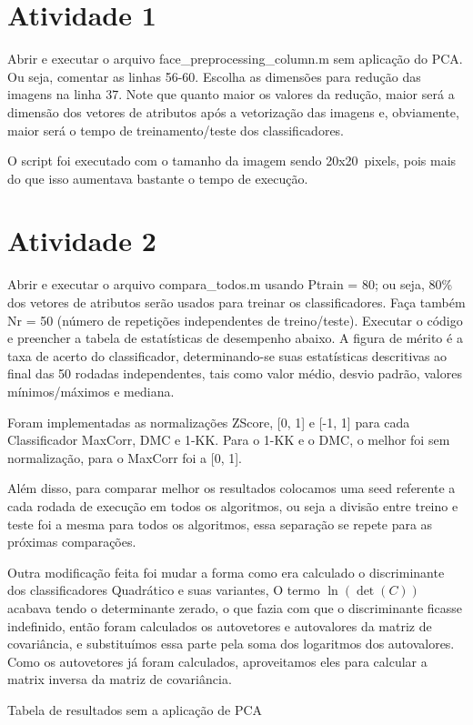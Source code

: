 \documentclass[a4paper,12pt]{article}
\newcommand{\nonumsection}[1]{%
  \section*{#1}%
  \addcontentsline{toc}{section}{#1}%
}
\begin{document}
\nonumsection{Atividade 1}
\begin{tcolorbox}[colback=blue!5!white, colframe=blue!75!black]
    Abrir e executar o arquivo face\_preprocessing\_column.m sem aplicação do
PCA. Ou seja, comentar as linhas 56-60. Escolha as dimensões para redução das imagens
na linha 37. Note que quanto maior os valores da redução, maior será a dimensão dos
vetores de atributos após a vetorização das imagens e, obviamente, maior será o tempo de
treinamento/teste dos classificadores.
\end{tcolorbox}

O script foi executado com o tamanho da imagem sendo 20x20~pixels,
pois mais do que isso aumentava bastante o tempo de execução. 
\nonumsection{Atividade 2}
\begin{tcolorbox}[colback=blue!5!white, colframe=blue!75!black]
    Abrir e executar o arquivo compara\_todos.m usando Ptrain = 80; ou seja,
80\% dos vetores de atributos serão usados para treinar os classificadores. Faça também
Nr = 50 (número de repetições independentes de treino/teste).
 Executar o código e preencher a tabela de estatísticas de desempenho abaixo. A figura de mérito é a taxa de
acerto do classificador, determinando-se suas estatísticas descritivas ao final das 50 rodadas
independentes, tais como valor médio, desvio padrão, valores mínimos/máximos e mediana.
\end{tcolorbox}
Foram implementadas as normalizações ZScore, [0, 1] e [-1, 1] para cada Classificador MaxCorr, DMC e 1-KK.
Para o 1-KK e o DMC, o melhor foi sem normalização,
para o MaxCorr foi a [0, 1].

Além disso, para comparar melhor os resultados colocamos uma seed referente a cada rodada de execução em todos os algoritmos,
ou seja a divisão entre treino e teste foi a mesma para todos os algoritmos,
essa separação se repete para as próximas comparações.

Outra modificação feita foi mudar a forma como era calculado o discriminante dos classificadores Quadrático e suas variantes,
O termo $\ln(\det(C))$ acabava tendo o determinante zerado, o que fazia com que o discriminante ficasse indefinido,
então foram calculados os autovetores e autovalores da matriz de covariância, e substituímos essa parte pela soma dos logaritmos dos autovalores.
Como os autovetores já foram calculados, aproveitamos eles para calcular a matrix inversa da matriz de covariância.

\begin{table}[H]
\centering
\resizebox{0.8\textwidth}{!}{

}
\caption{Tabela de resultados sem a aplicação de PCA}
\end{table}
\end{document}
